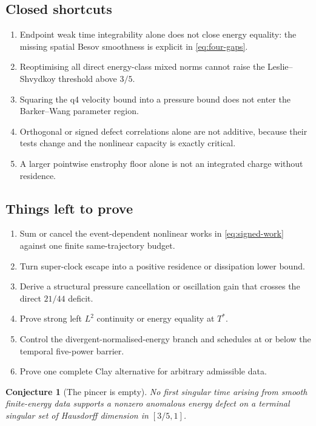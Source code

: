 \documentclass[11pt]{article}
\newtheorem{conjecture}[theorem]{Conjecture}
\theoremstyle{remark}
\begin{document}
\subsection*{Closed shortcuts}

\begin{enumerate}
\item Endpoint weak time integrability alone does not close energy
equality: the missing spatial Besov smoothness is explicit in
\eqref{eq:four-gaps}.
\item Reoptimising all direct energy-class mixed norms cannot raise the
Leslie--Shvydkoy threshold above \(3/5\).
\item Squaring the q4 velocity bound into a pressure bound does not
enter the Barker--Wang parameter region.
\item Orthogonal or signed defect correlations alone are not additive,
because their tests change and the nonlinear capacity is exactly
critical.
\item A larger pointwise enstrophy floor alone is not an integrated
charge without residence.
\end{enumerate}

\subsection*{Things left to prove}

\begin{enumerate}
\item Sum or cancel the event-dependent nonlinear works in
\eqref{eq:signed-work} against one finite same-trajectory budget.
\item Turn super-clock escape into a positive residence or dissipation
lower bound.
\item Derive a structural pressure cancellation or oscillation gain
that crosses the direct \(21/44\) deficit.
\item Prove strong left \(L^2\) continuity or energy equality at
\(T^*\).
\item Control the divergent-normalised-energy branch and schedules at
or below the temporal five-power barrier.
\item Prove one complete Clay alternative for arbitrary admissible
data.
\end{enumerate}

\begin{conjecture}[The pincer is empty]
No first singular time arising from smooth finite-energy data supports
a nonzero anomalous energy defect on a terminal singular set of
Hausdorff dimension in \([3/5,1]\).
\end{conjecture}
\end{document}
